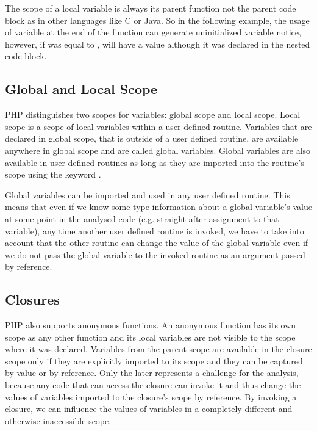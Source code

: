     The scope of a local variable is always its parent function not the 
    parent code block as in other languages like C or Java. 
    So in the following 
    example, the usage of variable  at the end 
    of the function can generate uninitialized variable notice, 
    however, if  was equal to , 
     will have a value although it 
    was declared in the nested code block.

    
    \subsection{Global and Local Scope}
    PHP distinguishes two scopes for variables: global scope and 
    local scope. Local scope is a scope of local variables 
    within a user defined routine.         
    Variables that are declared 
    in global scope, that is outside of a user defined routine, 
    are available anywhere in global scope and are called 
    global variables. Global variables are also available 
    in user defined routines as long as they are imported 
    into the routine's scope using the keyword .
    

    Global variables can be imported and used in any user defined 
    routine. This means that even if we know some type information 
    about a global variable's value at some point in the analysed 
    code (e.g. straight after assignment to that variable), 
    any time another user defined routine is invoked, we 
    have to take into account that the other routine can 
    change the value of the global variable even if we do not 
    pass the global variable to the invoked routine 
    as an argument passed by reference.

    \subsection{Closures}
    PHP also supports anonymous functions. An anonymous function has its 
    own scope as any other function and its local variables are not visible 
    to the scope where it was declared. Variables from the parent 
    scope are available in the closure scope only if they are 
    explicitly imported to its scope and they can be captured 
    by value or by reference. Only the later represents a 
    challenge for the analysis, because any code that can 
    access the closure can invoke it and thus change the 
    values of variables imported to the closure's scope 
    by reference. By invoking a closure, we can influence 
    the values of variables in a completely different 
    and otherwise inaccessible scope.
    
